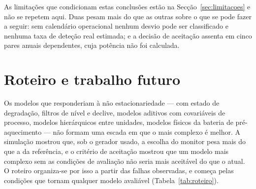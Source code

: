 As limitações que condicionam estas conclusões estão na
Secção~\ref{sec:limitacoes} e não se repetem aqui. Duas pesam mais do que as
outras sobre o que se pode fazer a seguir: sem calendário operacional nenhum
desvio pode ser classificado e nenhuma taxa de deteção real estimada; e a
decisão de aceitação assenta em cinco pares anuais dependentes, cuja
potência não foi calculada.

\section{Roteiro e trabalho futuro}
\label{sec:roteiro-modelos}
\label{sec:trabalho-futuro}

Os modelos que responderiam à não estacionariedade --- com estado de
degradação, filtros de nível e declive, modelos aditivos com covariáveis de
processo, modelos hierárquicos entre unidades, modelos físicos da bateria de
pré-aquecimento --- não formam uma escada em que o mais complexo é melhor. A
simulação mostrou que, sob o gerador usado, a escolha do monitor pesa mais do
que a da referência, e o critério de aceitação mostrou que um modelo mais
complexo sem as condições de avaliação não seria mais aceitável do que o
atual. O roteiro organiza-se por isso a partir das falhas observadas, e começa
pelas condições que tornam qualquer modelo avaliável
(Tabela~\ref{tab:roteiro}).

